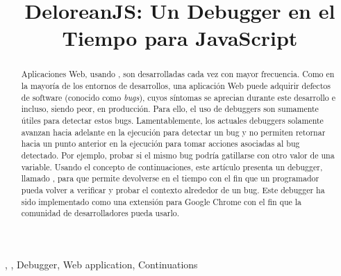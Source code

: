 \documentclass[conference]{IEEEtran}
\begin{document}
\title{DeloreanJS: Un Debugger en el Tiempo para JavaScript}

\author{
\and
{}
\and
{}
}

\maketitle

\begin{abstract}
Aplicaciones Web, usando \javascript, son desarrolladas cada vez con mayor frecuencia. Como en la mayor\'ia de los entornos de desarrollos, una aplicaci\'on Web puede adquirir defectos de software (conocido como {\em bugs}), cuyos s\'intomas se aprecian durante este desarrollo e incluso, siendo peor, en producci\'on. Para ello, el uso de debuggers son sumamente \'utiles para detectar estos bugs. Lamentablemente, los actuales debuggers solamente avanzan hacia adelante en la ejecuci\'on para detectar un bug y no permiten retornar hacia un punto anterior en la ejecuci\'on para tomar acciones asociadas al bug detectado. Por ejemplo, probar si el mismo bug podr\'ia gatillarse con otro valor de una variable. Usando el concepto de continuaciones, este art\'iculo presenta un debugger, llamado \deloreanjs,  para \javascript que permite devolverse en el tiempo con el fin que un programador pueda volver a verificar y probar el contexto alrededor de un bug. Este debugger ha sido implementado como una extensi\'on para Google Chrome con el fin que la comunidad de desarrolladores pueda usarlo.         
\end{abstract}

\begin{IEEEkeywords}
\deloreanjs, \javascript, Debugger, Web application, Continuations
\end{IEEEkeywords}
\end{document}
